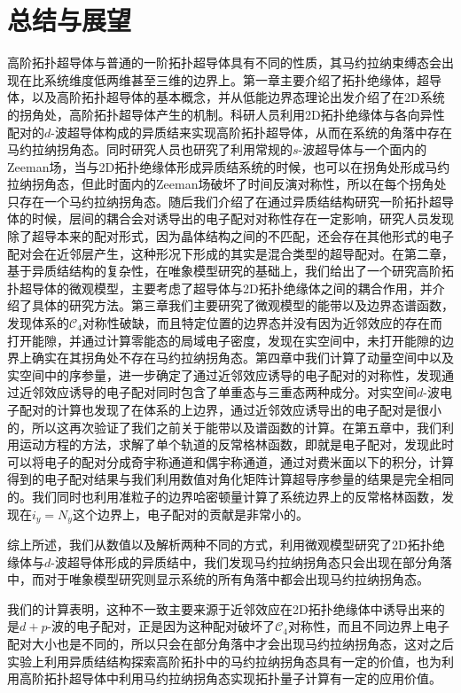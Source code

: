 \section{总结与展望}
高阶拓扑超导体与普通的一阶拓扑超导体具有不同的性质，其马约拉纳束缚态会出现在比系统维度低两维甚至三维的边界上。第一章主要介绍了拓扑绝缘体，超导体，以及高阶拓扑超导体的基本概念，并从低能边界态理论出发介绍了在2D系统的拐角处，高阶拓扑超导体产生的机制。科研人员利用2D拓扑绝缘体与各向异性配对的$d$-波超导体构成的异质结来实现高阶拓扑超导体，从而在系统的角落中存在马约拉纳拐角态。同时研究人员也研究了利用常规的$s$-波超导体与一个面内的Zeeman场，当与2D拓扑绝缘体形成异质结系统的时候，也可以在拐角处形成马约拉纳拐角态，但此时面内的Zeeman场破坏了时间反演对称性，所以在每个拐角处只存在一个马约拉纳拐角态。随后我们介绍了在通过异质结结构研究一阶拓扑超导体的时候，层间的耦合会对诱导出的电子配对对称性存在一定影响，研究人员发现除了超导本来的配对形式，因为晶体结构之间的不匹配，还会存在其他形式的电子配对会在近邻层产生，这种形况下形成的其实是混合类型的超导配对。在第二章，基于异质结结构的复杂性，在唯象模型研究的基础上，我们给出了一个研究高阶拓扑超导体的微观模型，主要考虑了超导体与2D拓扑绝缘体之间的耦合作用，并介绍了具体的研究方法。第三章我们主要研究了微观模型的能带以及边界态谱函数，发现体系的$\mathcal{C}_4$对称性破缺，而且特定位置的边界态并没有因为近邻效应的存在而打开能隙，并通过计算零能态的局域电子密度，发现在实空间中，未打开能隙的边界上确实在其拐角处不存在马约拉纳拐角态。第四章中我们计算了动量空间中以及实空间中的序参量，进一步确定了通过近邻效应诱导的电子配对的对称性，发现通过近邻效应诱导的电子配对同时包含了单重态与三重态两种成分。对实空间$d$-波电子配对的计算也发现了在体系的上边界，通过近邻效应诱导出的电子配对是很小的，所以这再次验证了我们之前关于能带以及谱函数的计算。在第五章中，我们利用运动方程的方法，求解了单个轨道的反常格林函数，即就是电子配对，发现此时可以将电子的配对分成奇宇称通道和偶宇称通道，通过对费米面以下的积分，计算得到的电子配对结果与我们利用数值对角化矩阵计算超导序参量的结果是完全相同的。我们同时也利用准粒子的边界哈密顿量计算了系统边界上的反常格林函数，发现在$i_y=N_y$这个边界上，电子配对的贡献是非常小的。

综上所述，我们从数值以及解析两种不同的方式，利用微观模型研究了2D拓扑绝缘体与$d$-波超导体形成的异质结中，我们发现马约拉纳拐角态只会出现在部分角落中，而对于唯象模型研究则显示系统的所有角落中都会出现马约拉纳拐角态。

我们的计算表明，这种不一致主要来源于近邻效应在2D拓扑绝缘体中诱导出来的是$d+p$-波的电子配对，正是因为这种配对破坏了$\mathcal{C}_4$对称性，而且不同边界上电子配对大小也是不同的，所以只会在部分角落中才会出现马约拉纳拐角态，这对之后实验上利用异质结结构探索高阶拓扑中的马约拉纳拐角态具有一定的价值，也为利用高阶拓扑超导体中利用马约拉纳拐角态实现拓扑量子计算有一定的应用价值。



